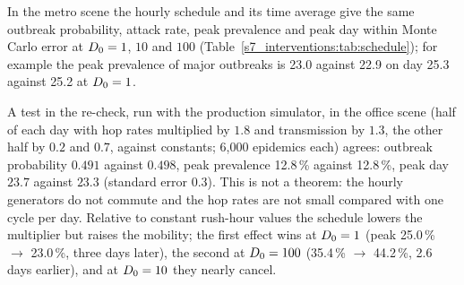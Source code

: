 \begin{observation}\label{s7_interventions:obs:average}
  In the metro scene the hourly schedule and its time average give the same outbreak probability, attack
  rate, peak prevalence and peak day within Monte Carlo error at $D_0=1$, $10$ and $100$
  (Table~\ref{s7_interventions:tab:schedule}); for example the peak prevalence of
  major outbreaks is 23.0\pct{} against 22.9\pct{} on day 25.3 against 25.2 at $D_0=1$.
\end{observation}
A test in the re-check, run with the production simulator, in the office scene (half of each day with hop rates multiplied by $1.8$
and transmission by $1.3$, the other half by $0.2$ and $0.7$, against constants; 6,000 epidemics each) agrees:
outbreak probability $0.491$ against $0.498$, peak prevalence 12.8\,\% against 12.8\,\%, peak day $23.7$ against
$23.3$ (standard error $0.3$).
This is not a theorem: the hourly generators do not commute and the hop rates are not small compared with one
cycle per day. Relative to constant rush-hour values the schedule lowers the multiplier but raises the
mobility; the first effect wins at $D_0=1$ (peak 25.0\,\% $\to$ 23.0\,\%, three days later), the second at
$D_0=100$ (35.4\,\% $\to$ 44.2\,\%, 2.6 days earlier), and at $D_0=10$ they nearly cancel.

